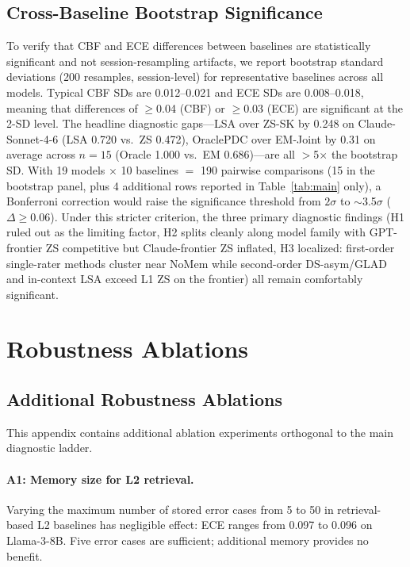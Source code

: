 \documentclass[11pt]{article}
\begin{document}
\subsection{Cross-Baseline Bootstrap Significance}
\label{app:cross_boot}

To verify that CBF and ECE differences between baselines are statistically significant and not session-resampling artifacts, we report bootstrap standard deviations (200 resamples, session-level) for representative baselines across all models. Typical CBF SDs are 0.012--0.021 and ECE SDs are 0.008--0.018, meaning that differences of $\geq$0.04 (CBF) or $\geq$0.03 (ECE) are significant at the 2-SD level. The headline diagnostic gaps---LSA over ZS-SK by 0.248 on Claude-Sonnet-4-6 (LSA 0.720 vs.\ ZS 0.472), OraclePDC over EM-Joint by 0.31 on average across $n{=}15$ (Oracle 1.000 vs.\ EM 0.686)---are all $>$5$\times$ the bootstrap SD. With 19 models $\times$ 10 baselines $=$ 190 pairwise comparisons (15 in the bootstrap panel, plus 4 additional rows reported in Table~\ref{tab:main} only), a Bonferroni correction would raise the significance threshold from $2\sigma$ to $\sim$3.5$\sigma$ ($\Delta \geq 0.06$). Under this stricter criterion, the three primary diagnostic findings (H1 ruled out as the limiting factor, H2 splits cleanly along model family with GPT-frontier ZS competitive but Claude-frontier ZS inflated, H3 localized: first-order single-rater methods cluster near NoMem while second-order DS-asym/GLAD and in-context LSA exceed L1 ZS on the frontier) all remain comfortably significant.




\section{Robustness Ablations}
\label{app:group_e}

\subsection{Additional Robustness Ablations}
\label{app:friend_or_foe}
\label{app:gpt55_ablation}
\label{app:detail_ablations}

This appendix contains additional ablation experiments orthogonal to the main diagnostic ladder.

\paragraph{A1: Memory size for L2 retrieval.}
Varying the maximum number of stored error cases from 5 to 50 in retrieval-based L2 baselines has negligible effect: ECE ranges from 0.097 to 0.096 on Llama-3-8B. Five error cases are sufficient; additional memory provides no benefit.
\end{document}
